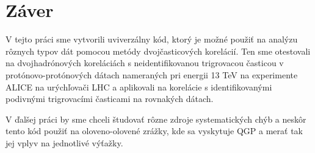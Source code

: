 \documentclass[thesismargins, thesislinespacing]{rnthesis}
\begin{document}
\chapter{Záver}

V tejto práci sme vytvorili uviverzálny kód, ktorý je možné použiť na analýzu rôznych typov dát pomocou metódy dvojčasticových korelácií. Ten sme otestovali na dvojhadrónových koreláciách s neidentifikovanou trigrovacou časticou v protónovo-protónových dátach nameraných pri energii 13 TeV na experimente ALICE na urýchľovači LHC a aplikovali na korelácie s identifikovanými podivnými trigrovacími časticami na rovnakých dátach.

V ďalšej práci by sme chceli študovať rôzne zdroje systematických chýb a neskôr tento kód použiť na oloveno-olovené zrážky, kde sa vyskytuje QGP a merať tak jej vplyv na jednotlivé výťažky. 



%
\end{document}
